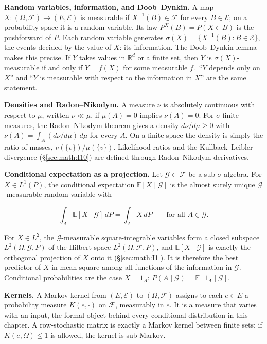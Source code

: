 \textbf{Random variables, information, and Doob--Dynkin.} A map \(X\colon (\Omega,
\mathcal{F}) \to (E, \mathcal{E})\) is measurable if \(X^{-1}(B) \in \mathcal{F}\) for every \(B \in \mathcal{E}\); on a
probability space it is a random variable. Its law \(P^X(B) = P(X \in B)\)
is the pushforward of \(P\). Each random variable generates \(\sigma(X) =
\{X^{-1}(B) : B \in \mathcal{E}\}\), the events decided by the value of \(X\): its
information. The Doob--Dynkin lemma makes this precise. If \(Y\) takes
values in \(\mathbb{R}^{d}\) or a finite set, then \(Y\) is \(\sigma(X)\)-measurable
if and only if \(Y = f(X)\) for some measurable \(f\).~``\(Y\) depends only on \(X\)''
and ``\(Y\) is measurable with respect to the information in \(X\)'' are the
same statement.

\textbf{Densities and Radon--Nikodym.} A measure \(\nu\) is absolutely
continuous with respect to \(\mu\), written \(\nu \ll \mu\), if \(\mu(A) = 0\) implies \(\nu(A) =
0\). For \(\sigma\)-finite measures, the Radon--Nikodym theorem gives a density
\(d\nu/d\mu \ge 0\) with \(\nu(A) = \int_A (d\nu/d\mu)\, d\mu\) for every \(A\). On a finite space the
density is simply the ratio of masses, \(\nu(\{v\})/\mu(\{v\})\). Likelihood
ratios and the Kullback--Leibler divergence (\S\ref{sec:math:I10}) are defined through
Radon--Nikodym derivatives.

\textbf{Conditional expectation as a projection.} Let \(\mathcal{G} \subset \mathcal{F}\) be a
sub-\(\sigma\)-algebra. For \(X \in L^{1}(P)\), the conditional expectation \(\mathbb{E}[X
\mid \mathcal{G}]\) is the almost surely unique \(\mathcal{G}\)-measurable random variable
with

\[
\int_A \mathbb{E}[X \mid \mathcal{G}]\, dP = \int_A X \, dP \qquad \text{for all } A \in \mathcal{G}.
\]

For \(X \in L^{2}\), the \(\mathcal{G}\)-measurable square-integrable variables form a
closed subspace \(L^{2}(\Omega, \mathcal{G}, P)\) of the Hilbert space \(L^{2}(\Omega, \mathcal{F},
P)\), and \(\mathbb{E}[X \mid \mathcal{G}]\) is exactly the orthogonal projection of \(X\)
onto it (\S\ref{sec:math:I1}). It is therefore the best predictor of \(X\) in mean square
among all functions of the information in \(\mathcal{G}\). Conditional probabilities
are the case \(X = 1_A\): \(P(A \mid \mathcal{G}) = \mathbb{E}[1_A \mid \mathcal{G}]\).

\textbf{Kernels.} A Markov kernel from \((E, \mathcal{E})\) to \((\Omega, \mathcal{F})\) assigns to each
\(e \in E\) a probability measure \(K(e, \cdot)\) on \(\mathcal{F}\), measurably in \(e\). It is a
measure that varies with an input, the formal object behind every
conditional distribution in this chapter. A row-stochastic matrix is
exactly a Markov kernel between finite sets; if \(K(e, \Omega) \le 1\) is allowed,
the kernel is sub-Markov.

